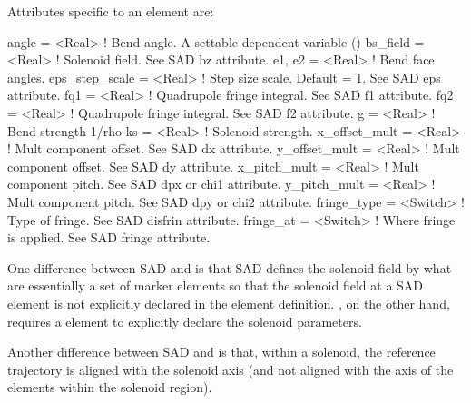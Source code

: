 {
Attributes specific to an  element are:
\begin{example}
  angle           = <Real>    ! Bend angle. A settable dependent variable ()
  bs_field        = <Real>    ! Solenoid field. See SAD bz attribute.
  e1, e2          = <Real>    ! Bend face angles.
  eps_step_scale  = <Real>    ! Step size scale. Default = 1. See SAD eps attribute.
  fq1             = <Real>    ! Quadrupole fringe integral. See SAD f1 attribute.
  fq2             = <Real>    ! Quadrupole fringe integral. See SAD f2 attribute.
  g               = <Real>    ! Bend strength 1/rho
  ks              = <Real>    ! Solenoid strength. 
  x_offset_mult   = <Real>    ! Mult component offset. See SAD dx attribute.
  y_offset_mult   = <Real>    ! Mult component offset. See SAD dy attribute.
  x_pitch_mult    = <Real>    ! Mult component pitch. See SAD dpx or chi1 attribute.
  y_pitch_mult    = <Real>    ! Mult component pitch. See SAD dpy or chi2 attribute.
  fringe_type     = <Switch>  ! Type of fringe. See SAD disfrin attribute.
  fringe_at       = <Switch>  ! Where fringe is applied. See SAD fringe attribute.
\end{example}


One difference between SAD and \bmad is that SAD defines the solenoid
field by what are essentially a set of marker elements so that the
solenoid field at a SAD  element is not explicitly declared
in the  element definition. \bmad, on the other hand,
requires a  element to explicitly declare the solenoid
parameters.

Another difference between SAD and \bmad is that, within a solenoid,
the reference trajectory is aligned with the solenoid axis (and not
aligned with the axis of the elements within the solenoid region).

}
